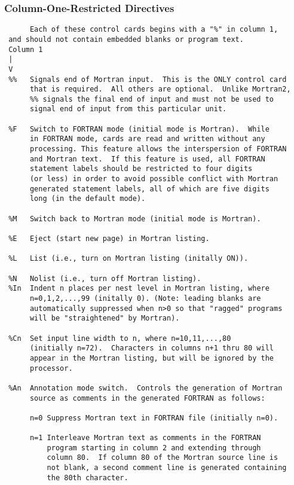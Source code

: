  \subsubsection{Column-One-Restricted Directives}
 \begin{verbatim}
      Each of these control cards begins with a "%" in column 1,
 and should not contain embedded blanks or program text.
 Column 1
 |
 V
 %%   Signals end of Mortran input.  This is the ONLY control card
      that is required.  All others are optional.  Unlike Mortran2,
      %% signals the final end of input and must not be used to
      signal end of input from this particular unit.
 
 %F   Switch to FORTRAN mode (initial mode is Mortran).  While
      in FORTRAN mode, cards are read and written without any
      processing. This feature allows the interspersion of FORTRAN
      and Mortran text.  If this feature is used, all FORTRAN
      statement labels should be restricted to four digits
      (or less) in order to avoid possible conflict with Mortran
      generated statement labels, all of which are five digits
      long (in the default mode).
 
 %M   Switch back to Mortran mode (initial mode is Mortran).
 
 %E   Eject (start new page) in Mortran listing.
 
 %L   List (i.e., turn on Mortran listing (initally ON)).
 
 %N   Nolist (i.e., turn off Mortran listing).
 %In  Indent n places per nest level in Mortran listing, where
      n=0,1,2,...,99 (initally 0). (Note: leading blanks are
      automatically suppressed when n>0 so that "ragged" programs
      will be "straightened" by Mortran).
 
 %Cn  Set input line width to n, where n=10,11,...,80
      (initially n=72).  Characters in columns n+1 thru 80 will
      appear in the Mortran listing, but will be ignored by the
      processor.
 
 %An  Annotation mode switch.  Controls the generation of Mortran
      source as comments in the generated FORTRAN as follows:
 
      n=0 Suppress Mortran text in FORTRAN file (initially n=0).
 
      n=1 Interleave Mortran text as comments in the FORTRAN
          program starting in column 2 and extending through
          column 80.  If column 80 of the Mortran source line is
          not blank, a second comment line is generated containing
          the 80th character.
 

\end{verbatim}
